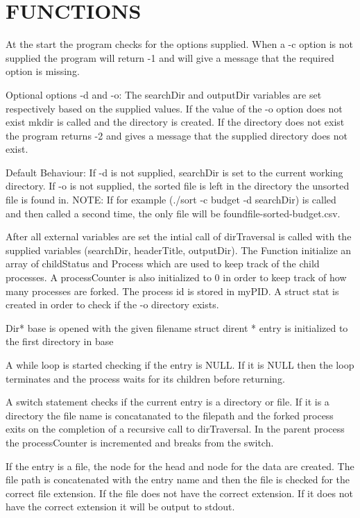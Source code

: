\documentclass{article}
\begin{document}
\section{FUNCTIONS}
\begin{center}

At the start the program checks for the options supplied.
When a -c option is not supplied the program will return -1
and will give a message that the required option is missing.

Optional options -d and -o:
The searchDir and outputDir variables are set respectively based on the supplied values. If the value of the -o option does not exist mkdir is called and the directory is created. If the directory does not exist the program returns -2 and gives a message that the supplied directory does not exist.

Default Behaviour:
If -d is not supplied, searchDir is set to the current working directory.
If -o is not supplied, the sorted file is left in the directory the unsorted file is found in.
NOTE: If for example (./sort -c budget -d searchDir) is called
and then called a second time, the only file will be foundfile-sorted-budget.csv.

After all external variables are set the intial call of dirTraversal is called with the supplied variables (searchDir, headerTitle, outputDir).
The Function initialize an array of childStatus and Process which are used to keep track of the child processes. A processCounter is also initialized to 0 in order to keep track of how many processes are forked. The process id is stored in myPID. A struct stat is created in order to check if the -o directory exists.

Dir* base is opened with the given filename
struct dirent * entry is initialized to the first directory in base

A while loop is started checking if the entry is NULL. If it is NULL then the loop terminates and the process waits for its children before returning.

A switch statement checks if the current entry is a directory or file.
If it is a directory the file name is concatanated to the filepath and the forked process exits on the completion of a recursive call to dirTraversal. In the parent process the processCounter is incremented and breaks from the switch.

If the entry is a file, the node for the head and node for the data are created. The file path is concatenated with the entry name and then the file is checked for the correct file extension. If the file does not have the correct extension. If it does not have the correct extension it will be output to stdout. 


\end{center}
\end{document}
